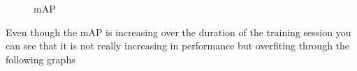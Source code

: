 \begin{figure}[hbt!]
    \begin{center}
        \caption{mAP}
    \end{center}
\end{figure}
\newpage \noindent
Even though the mAP is increasing over the duration of the training session you can see that it is not really increasing in performance but
overfiting through the following graphs

